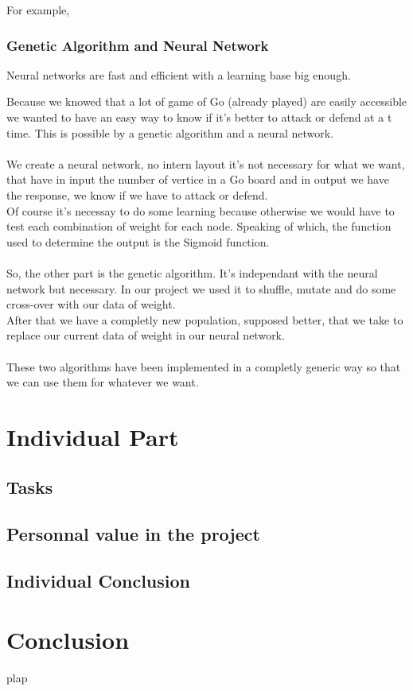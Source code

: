 For example, 

\subsection{Genetic Algorithm and Neural Network}

Neural networks are fast and efficient with a learning base big enough.

Because we knowed that a lot of game of Go (already played) are easily
accessible we wanted to have an easy way to know if it's better to attack or
defend at a t time. This is possible by a genetic algorithm and a neural
network.\\
\\
We create a neural network, no intern layout it's not necessary for what we
want, that have in input the number of vertice in a Go board and in output we
have the response, we know if we have to attack or defend.\\
Of course it's necessay to do some learning because otherwise we would have to
test each combination of weight for each node. Speaking of which, the function
used to determine the output is the Sigmoid function.\\
\\
So, the other part is the genetic algorithm. It's independant with the
neural network but necessary. In our project we used it to shuffle, mutate and
do some cross-over with our data of weight.\\
After that we have a completly new population, supposed better, that we take to
replace our current data of weight in our neural network.\\
\\
These two algorithms have been implemented in a completly generic way so that we
can use them for whatever we want.\\

\chapter{Individual Part}

\section{Tasks}

\section{Personnal value in the project}

\section{Individual Conclusion}

\chapter*{Conclusion}
plap


